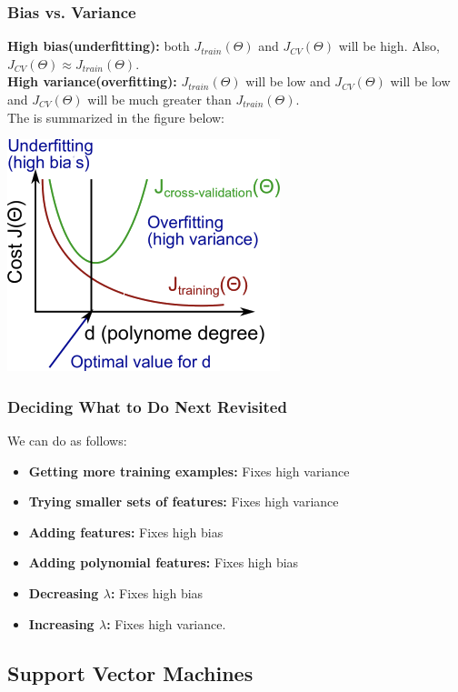 \documentclass{article}
\begin{document}
\subsubsection{Bias vs. Variance}
\textbf{High bias(underfitting):} both $J_{train}(\Theta)$ and $J_{CV}(\Theta)$ will be high. Also, $J_{CV}(\Theta) \approx J_{train}(\Theta)$.\\
\textbf{High variance(overfitting):} $J_{train}(\Theta)$ will be low and $J_{CV}(\Theta)$ will be low and $J_{CV}(\Theta)$ will be much greater than $J_{train}(\Theta)$.\\
The is summarized in the figure below:
\begin{center}
\includegraphics[scale=0.6]{4.png}
\end{center}

\subsubsection{Deciding What to Do Next Revisited}
We can do as follows:
\begin{itemize}
  \item \textbf{Getting more training examples:} Fixes high variance
  \item \textbf{Trying smaller sets of features:} Fixes high variance
  \item \textbf{Adding features:} Fixes high bias
  \item \textbf{Adding polynomial features:} Fixes high bias
  \item \textbf{Decreasing $\lambda$:} Fixes high bias
  \item \textbf{Increasing $\lambda$:} Fixes high variance.
\end{itemize}

\subsection{Support Vector Machines}
\end{document}
